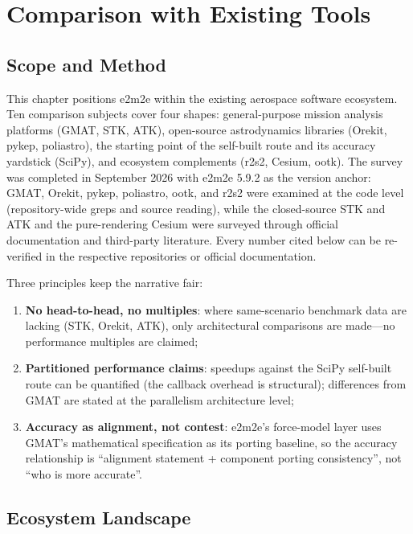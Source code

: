 \section{Comparison with Existing Tools}
\label{sec:comparison}

\subsection{Scope and Method}

This chapter positions e2m2e within the existing aerospace software
ecosystem. Ten comparison subjects cover four shapes: general-purpose mission
analysis platforms (GMAT, STK, ATK), open-source astrodynamics libraries
(Orekit, pykep, poliastro), the starting point of the self-built route and
its accuracy yardstick (SciPy), and ecosystem complements (r2s2, Cesium,
ootk). The survey was completed in September 2026 with e2m2e 5.9.2 as the
version anchor: GMAT, Orekit, pykep, poliastro, ootk, and r2s2 were examined
at the code level (repository-wide greps and source reading), while the
closed-source STK and ATK and the pure-rendering Cesium were surveyed through
official documentation and third-party literature. Every number cited below
can be re-verified in the respective repositories or official documentation.

Three principles keep the narrative fair:

\begin{enumerate}
  \item \textbf{No head-to-head, no multiples}: where same-scenario
        benchmark data are lacking (STK, Orekit, ATK), only architectural
        comparisons are made---no performance multiples are claimed;
  \item \textbf{Partitioned performance claims}: speedups against the SciPy
        self-built route can be quantified (the callback overhead is
        structural); differences from GMAT are stated at the parallelism
        architecture level;
  \item \textbf{Accuracy as alignment, not contest}: e2m2e's force-model
        layer uses GMAT's mathematical specification as its porting baseline,
        so the accuracy relationship is ``alignment statement + component
        porting consistency'', not ``who is more accurate''.
\end{enumerate}

\subsection{Ecosystem Landscape}

